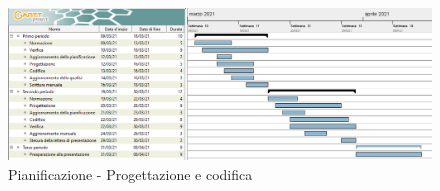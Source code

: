 \newpage 

\begin{landscape} 
	\begin{figure}[h!] 
		\includegraphics[width=24cm]{images/4_Progettazione_e_codifica.png} 
		\caption{Pianificazione - Progettazione e codifica} 
	\end{figure} 
\end{landscape} 

\newpage %
